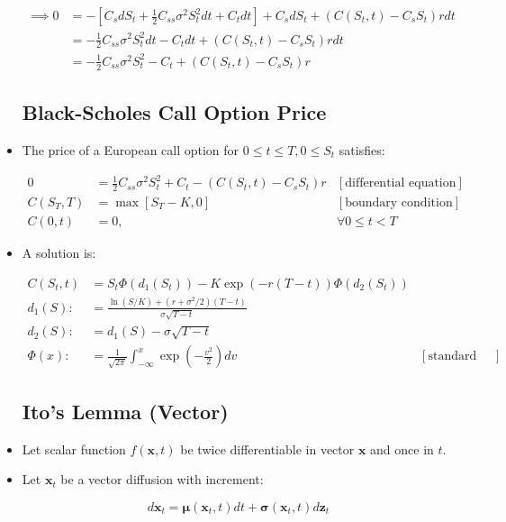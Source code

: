 \documentclass{article}
\newcommand{\xvec}{\mathbf{x}}
\newcommand{\zvec}{\mathbf{z}}
\newcommand{\muvec}{\boldsymbol{\mu}}
\newcommand{\sigmamat}{\boldsymbol{\sigma}}
\begin{document}
\begin{itemize}
\begin{align*}
\implies 0 
&= -[ C_s dS_t + \frac{1}{2} C_{ss} \sigma^2 S_t^2 dt + C_t dt] + C_s dS_t + (C(S_t, t) - C_s S_t)rdt\\
&= - \frac{1}{2} C_{ss} \sigma^2 S_t^2 dt - C_t dt + (C(S_t, t) - C_s S_t)rdt\\
&= - \frac{1}{2} C_{ss} \sigma^2 S_t^2 - C_t + (C(S_t, t) - C_s S_t)r
\end{align*}

\subsection*{Black-Scholes Call Option Price}

\item The price of a European call option for $0 \le t \le T, 0 \le S_t$ satisfies:

\begin{align*}
0 &= \frac{1}{2} C_{ss} \sigma^2 S_t^2 + C_t - (C(S_t, t) - C_s S_t)r & [\text{differential equation}]\\
C(S_T, T) &= \max[S_T - K, 0] & [\text{boundary condition}]\\
C(0, t) &= 0, & \forall 0 \le t < T
\end{align*}

\item A solution is:

\begin{align*}
C(S_t, t) &= S_t \Phi(d_1(S_t)) - K \exp(-r(T-t)) \Phi(d_2(S_t)) \\
d_1(S) :&= \frac{\ln(S/K) + (r+\sigma^2/2)(T-t)}{\sigma\sqrt{T - t}} \\
d_2(S) :&= d_1(S) - \sigma \sqrt{T - t}\\
\Phi(x) :&= \frac{1}{\sqrt{2\pi}} \int_{-\infty}^x \exp (- \frac{v^2}{2}) dv & [\text{standard normal cdf}]
\end{align*}

\subsection*{Ito's Lemma (Vector)}

\item Let scalar function $f(\xvec, t)$ be twice differentiable in vector $\xvec$ and once in $t$.

\item Let $\xvec_t$ be a vector diffusion with increment:

$$
d \xvec_t = \muvec(\xvec_t, t) dt + \sigmamat(\xvec_t, t) d \zvec_t
$$


\end{itemize}
\end{document}
